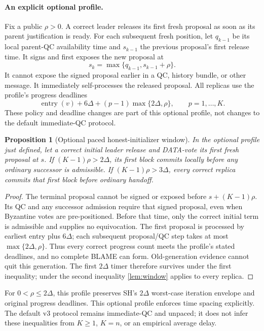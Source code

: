 \documentclass[11pt,a4paper]{article}
\newtheorem{proposition}[proposition]{Proposition}
\newcounter{protocol}
\begin{document}
\paragraph{An explicit optional profile.}
Fix a public $\rho>0$. A correct leader releases its first fresh proposal
as soon as its parent justification is ready. For each subsequent fresh
position, let $q_{k-1}$ be its local parent-QC availability time and
$s_{k-1}$ the previous proposal's first release time. It signs and first
exposes the new proposal at
\[
 s_k=\max\{q_{k-1},s_{k-1}+\rho\}.
\]
It cannot expose the signed proposal earlier in a QC, history bundle, or
other message. It immediately self-processes the released proposal.
All replicas use the profile's progress deadlines
\[
 \operatorname{entry}(v)+6\Delta+
        (p-1)\max\{2\Delta,\rho\},\qquad p=1,\ldots,K.
\]
These policy and deadline changes are part of this optional profile,
not changes to the default immediate-QC protocol.

\begin{proposition}[Optional paced honest-initializer window]
\label{prop:pacing}
In the optional profile just defined, let a correct initial leader
release and DATA-vote its first fresh proposal at $s$. If
$(K-1)\rho>2\Delta$, its first block commits locally before any
ordinary successor is admissible. If $(K-1)\rho>3\Delta$, every correct
replica commits that first block before ordinary handoff.
\end{proposition}
\begin{proof}
The terminal proposal cannot be signed or exposed before $s+(K-1)\rho$.
Its QC and any successor admission require that signed proposal, even
when Byzantine votes are pre-positioned. Before that time, only the
correct initial term is admissible and supplies no equivocation.
The first proposal is processed by earliest entry plus $6\Delta$;
each subsequent proposal/QC step takes at most
$\max\{2\Delta,\rho\}$. Thus every correct progress count meets the
profile's stated deadlines, and no complete BLAME can form.
Old-generation evidence cannot quit this generation. The first
$2\Delta$ timer therefore survives under the first inequality; under
the second inequality \cref{lem:window} applies to every replica.
\end{proof}
For $0<\rho\le2\Delta$, this profile preserves SH's
$2\Delta$ worst-case iteration envelope and original progress deadlines.
This optional profile enforces time spacing explicitly. The default
v3 protocol remains immediate-QC and unpaced; it does not infer these
inequalities from $K\ge1$, $K=n$, or an empirical average delay.
\end{document}
